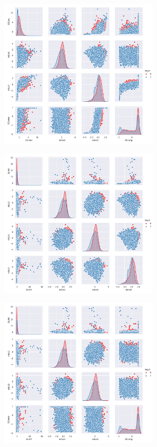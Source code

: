 \begin{figure}[h]
\centering
\includegraphics[width=0.7\textwidth]{output/figure_10.png}
\end{figure}
\begin{figure}[h]
\centering
\includegraphics[width=0.7\textwidth]{output/figure_11.png}
\end{figure}
\begin{figure}[h]
\centering
\includegraphics[width=0.7\textwidth]{output/figure_12.png}
\end{figure}
